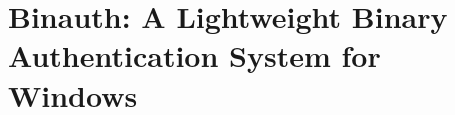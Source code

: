 \section{Binauth: A Lightweight Binary Authentication System for Windows}
\label{sec:binauth}







